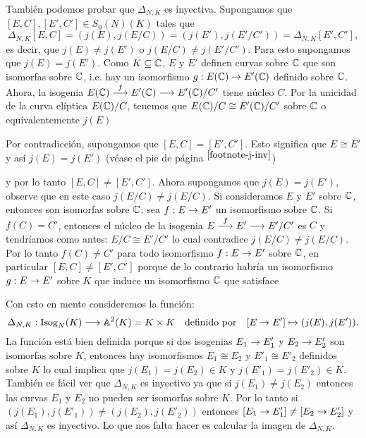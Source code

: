 \documentclass[../../tesis_maestria]{subfiles}
\begin{document}
También podemos probar que $\Delta_{N,K}$ es inyectiva. Supongamos que $[E,C],[E',C']\in S_0(N)(K)$ tales que
\[
	\Delta_{N,K}[E,C]=(j(E),j(E/C))=(j(E'),j(E'/C'))=\Delta_{N,K}[E',C'],
\]
es decir, que $j(E)\neq j(E')$ o $j(E/C)\neq j(E'/C')$. Para esto supongamos que $j(E)=j(E')$. Como $K\subseteq\mathbb{C}$, $E$ y $E'$ definen curvas sobre $\mathbb{C}$ que son isomorfas sobre $\mathbb{C}$, i.e. hay un isomorfismo $g:E(\mathbb{C})\rightarrow E'(\mathbb{C})$ definido sobre $\mathbb{C}$. Ahora, la isogenia $E(\mathbb{C})\overset{f}{\longrightarrow} E'(\mathbb{C})\longrightarrow E'(\mathbb{C})/C'$ tiene núcleo $C$. Por la unicidad de la curva elíptica $E(\mathbb{C})/C$, tenemos que $E(\mathbb{C})/C\cong E'(\mathbb{C})/C'$ sobre $\mathbb{C}$ o equivalentemente $j(E)$

Por contradicción, supongamos que $[E,C]=[E',C']$. Esto significa que $E\cong E'$ y así $j(E)=j(E')$ (véase el pie de página ${}^{\ref{footnote-j-inv}}$)



 y por lo tanto $[E,C]\neq[E',C']$. Ahora supongamos que $j(E)=j(E')$, observe que en este caso $j(E/C)\neq j(E/C)$. Si consideramos $E$ y $E'$ sobre $\mathbb{C}$, entonces son isomorfas sobre $\mathbb{C}$; sea $f:E\rightarrow E'$ un isomorfismo sobre $\mathbb{C}$. Si $f(C)=C'$, entonces el núcleo de la isogenia $E\overset{f}{\longrightarrow} E'\longrightarrow E'/C'$ es $C$ y tendríamos como antes: $E/C\cong E'/C'$ lo cual contradice $j(E/C)\neq j(E/C)$. Por lo tanto $f(C)\neq C'$ para todo isomorfismo $f:E\rightarrow E'$ sobre $\mathbb{C}$, en particular $[E,C]\neq[E',C']$ porque de lo contrario habría un isomorfismo $g:E\rightarrow E'$ sobre $K$ que induce un isomorfismo $\mathbb{C}$ que satisface 


Con esto en mente consideremos la función:
\[
	\Delta_{N,K}: \mathrm{Isog}_N(K)\longrightarrow \mathbb{A}^2(K)=K\times K\quad\text{definido por}\quad [E\rightarrow E']\mapsto(j(E),j(E')).
\]
La función está bien definida porque si dos isogenias $E_1\rightarrow E'_1$ y $E_2\rightarrow E'_2$ son isomorfas sobre $K$, entonces hay isomorfismos $E_1\cong E_2$ y $E'_1\cong E'_2$ definidos sobre $K$ lo cual implica que $j(E_1)=j(E_2)\in K$ y $j(E'_1)=j(E'_2)\in K$. También es fácil ver que $\Delta_{N,K}$ es inyectivo ya que si $j(E_1)\neq j(E_2)$ entonces las curvas $E_1$ y $E_2$ no pueden ser isomorfas sobre $K$. Por lo tanto si $(j(E_1),j(E'_1))\neq(j(E_2),j(E'_2))$ entonces $[E_1\rightarrow E'_1]\neq[E_2\rightarrow E'_2]$ y así $\Delta_{N,K}$ es inyectivo. Lo que nos falta hacer es calcular la imagen de $\Delta_{N,K}$.
\end{document}
